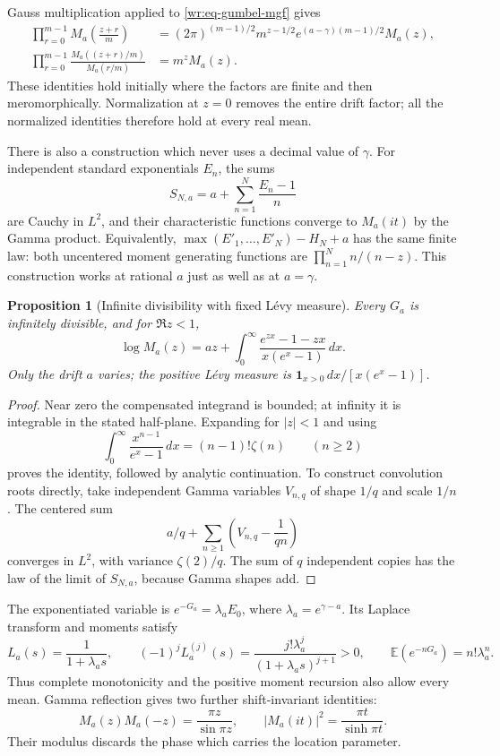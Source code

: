 \documentclass[11pt,a4paper]{article}
\newtheorem{proposition}[theorem]{Proposition}
\theoremstyle{definition}
\theoremstyle{remark}
\numberwithin{equation}{section}
\begin{document}
Gauss multiplication applied to \eqref{wr:eq-gumbel-mgf} gives
\begin{align}
 \prod_{r=0}^{m-1}M_a\!\left(\frac{z+r}{m}\right)
 &= (2\pi)^{(m-1)/2}m^{z-1/2}
 e^{(a-\gamma)(m-1)/2}M_a(z),\label{wr:eq-mult-un}\\
 \prod_{r=0}^{m-1}
 \frac{M_a((z+r)/m)}{M_a(r/m)}
 &=m^zM_a(z).\label{wr:eq-mult-normalized}
\end{align}
These identities hold initially where the factors are finite and then
meromorphically. Normalization at \(z=0\) removes the entire drift
factor; all the normalized identities therefore hold at every real
mean.

There is also a construction which never uses a decimal value of
\(\gamma\). For independent standard exponentials \(E_n\), the sums
\[
 S_{N,a}=a+\sum_{n=1}^N\frac{E_n-1}{n}
\]
are Cauchy in \(L^2\), and their characteristic functions converge to
\(M_a(it)\) by the Gamma product. Equivalently,
\(\max(E'_1,\ldots,E'_N)-H_N+a\) has the same finite law: both
uncentered moment generating functions are
\(\prod_{n=1}^N n/(n-z)\). This construction works at rational \(a\)
just as well as at \(a=\gamma\).

\begin{proposition}[Infinite divisibility with fixed L\'evy measure]
\label{wr:prop-levy}
Every \(G_a\) is infinitely divisible, and for \(\Re z<1\),
\begin{equation}\label{wr:eq-levy}
 \log M_a(z)=az+
 \int_0^\infty\frac{e^{zx}-1-zx}{x(e^x-1)}\,dx.
\end{equation}
Only the drift \(a\) varies; the positive L\'evy measure is
\(\mathbf1_{x>0}\,dx/[x(e^x-1)]\).
\end{proposition}
\begin{proof}
Near zero the compensated integrand is bounded; at infinity it is
integrable in the stated half-plane. Expanding for \(|z|<1\) and using
\[
 \int_0^\infty\frac{x^{n-1}}{e^x-1}\,dx=(n-1)!\zeta(n)
 \qquad(n\ge2)
\]
proves the identity, followed by analytic continuation. To construct
convolution roots directly, take independent Gamma variables
\(V_{n,q}\) of shape \(1/q\) and scale \(1/n\). The centered sum
\[
 a/q+\sum_{n\ge1}\left(V_{n,q}-\frac1{qn}\right)
\]
converges in \(L^2\), with variance \(\zeta(2)/q\). The sum of \(q\)
independent copies has the law of the limit of \(S_{N,a}\), because
Gamma shapes add.
\end{proof}

The exponentiated variable is \(e^{-G_a}=\lambda_a E_0\), where
\(\lambda_a=e^{\gamma-a}\). Its Laplace transform and moments satisfy
\[
 L_a(s)=\frac1{1+\lambda_as},\qquad
 (-1)^jL_a^{(j)}(s)=\frac{j!\lambda_a^j}{(1+\lambda_as)^{j+1}}>0,
 \qquad \mathbb E(e^{-nG_a})=n!\lambda_a^n.
\]
Thus complete monotonicity and the positive moment recursion also
allow every mean. Gamma reflection gives two further shift-invariant
identities:
\[
 M_a(z)M_a(-z)=\frac{\pi z}{\sin\pi z},\qquad
 |M_a(it)|^2=\frac{\pi t}{\sinh\pi t}.
\]
Their modulus discards the phase which carries the location parameter.
\end{document}
